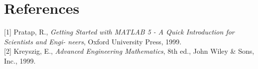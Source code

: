 \documentclass[paper=a4, fontsize=11pt]{scrartcl} %
\numberwithin{equation}{section} %
\numberwithin{figure}{section} %
\numberwithin{table}{section} %
\begin{document}
\newpage
\section*{\textbf{References}}
[1] Pratap, R., \textit{Getting Started with MATLAB 5 - A Quick Introduction for Scientists and Engi-
neers}, Oxford University Press, 1999.\\

[2] Kreyszig, E., \textit{Advanced Engineering Mathematics}, 8th ed., John Wiley \& Sons, Inc., 1999.



\end{document}
